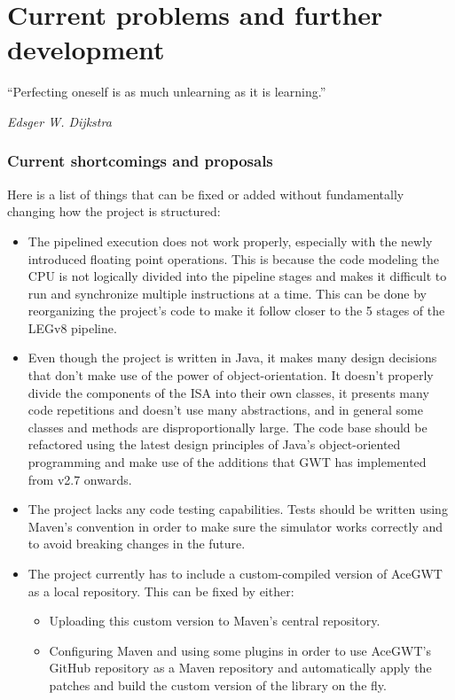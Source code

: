 \chapter{Current problems and further development}\label{chap:chap4}

\epigraph{``Perfecting oneself is as much unlearning as it is learning.''}{\textit{Edsger W. Dijkstra}}



\subsection*{Current shortcomings and proposals}

Here is a list of things that can be fixed or added without fundamentally changing how the project is structured:

\begin{itemize}
	\item The pipelined execution does not work properly, especially with the newly introduced floating point operations. This is because the code modeling the CPU is not logically divided into the pipeline stages and makes it difficult to run and synchronize multiple instructions at a time. This can be done by reorganizing the project's code to make it follow closer to the 5 stages of the LEGv8 pipeline.
	\item Even though the project is written in Java, it makes many design decisions that don't make use of the power of object-orientation. It doesn't properly divide the components of the ISA into their own classes, it presents many code repetitions and doesn't use many abstractions, and in general some classes and methods are disproportionally large. The code base should be refactored using the latest design principles of Java's object-oriented programming and make use of the additions that GWT has implemented from v2.7 onwards.
	\item The project lacks any code testing capabilities. Tests should be written using Maven's convention in order to make sure the simulator works correctly and to avoid breaking changes in the future.
	\item The project currently has to include a custom-compiled version of AceGWT as a local repository. This can be fixed by either:
	\begin{itemize}[label=$\rightarrow$]
		\item Uploading this custom version to Maven's central repository.
		\item Configuring Maven and using some plugins in order to use AceGWT's GitHub repository as a Maven repository and automatically apply the patches and build the custom version of the library on the fly.

\end{itemize}
\end{itemize}
